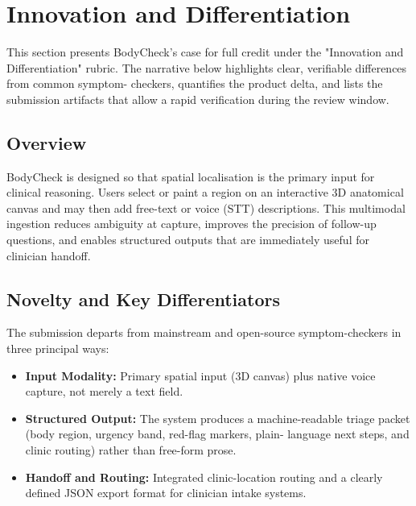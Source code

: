 
\section{Innovation and Differentiation}
\label{sec:innovation}

This section presents BodyCheck's case for full credit under the
"Innovation and Differentiation" rubric. The narrative below highlights clear, verifiable differences from common symptom-
checkers, quantifies the product delta, and lists the submission artifacts
that allow a rapid verification during the review window.

\subsection{Overview}
BodyCheck is designed so that spatial localisation is the primary input for
clinical reasoning. Users select or paint a region on an interactive 3D
anatomical canvas and may then add free-text or voice (STT) descriptions.
This multimodal ingestion reduces ambiguity at capture, improves the
precision of follow-up questions, and enables structured outputs that are
immediately useful for clinician handoff.

\subsection{Novelty and Key Differentiators}
The submission departs from mainstream and open-source symptom-checkers in
three principal ways:

\begin{itemize}[leftmargin=2em]
  \item \textbf{Input Modality:} Primary spatial input (3D canvas) plus
        native voice capture, not merely a text field.
  \item \textbf{Structured Output:} The system produces a machine-readable
        triage packet (body region, urgency band, red-flag markers, plain-
        language next steps, and clinic routing) rather than free-form prose.
  \item \textbf{Handoff and Routing:} Integrated clinic-location routing and
        a clearly defined JSON export format for clinician intake systems.
\end{itemize}

